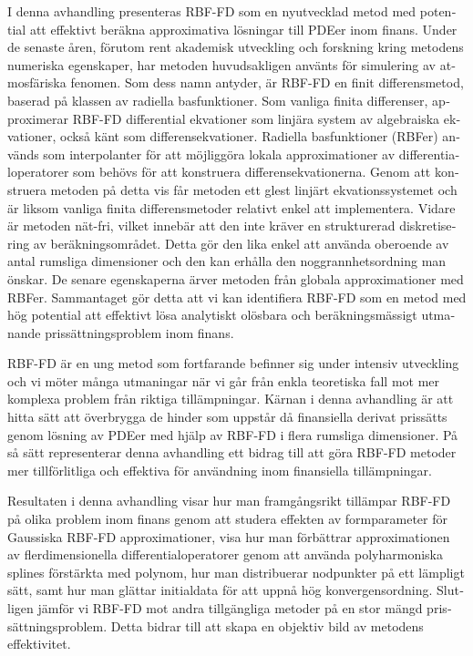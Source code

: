 \documentclass{UUThesisTemplate}
\begin{document}
\begin{swedish}
{\par
I denna avhandling presenteras RBF-FD som en nyutvecklad metod med potential att effektivt beräkna approximativa lösningar till PDEer inom finans.
Under de senaste åren, förutom rent akademisk utveckling och forskning kring metodens numeriska egenskaper, har metoden huvudsakligen använts för simulering av atmosfäriska fenomen.
Som dess namn antyder, är RBF-FD en finit differensmetod, baserad på klassen av radiella basfunktioner.
Som vanliga finita differenser, approximerar RBF-FD differential ekvationer som linjära system av algebraiska ekvationer, också känt som differensekvationer.
Radiella basfunktioner (RBFer) används som interpolanter för att möjliggöra lokala approximationer av differentialoperatorer som behövs för att konstruera differensekvationerna.
Genom att konstruera metoden på detta vis får metoden ett glest linjärt ekvationssystemet 
och är liksom vanliga finita differensmetoder relativt enkel att implementera.
Vidare är metoden nät-fri, vilket innebär att den inte kräver en strukturerad diskretisering av beräkningsområdet. Detta gör den lika enkel att använda oberoende av antal rumsliga dimensioner och den kan erhålla den noggrannhetsordning man önskar. De senare egenskaperna ärver metoden från globala approximationer med RBFer. Sammantaget gör detta att vi kan identifiera RBF-FD som en metod med hög potential att effektivt lösa analytiskt olösbara och beräkningsmässigt utmanande prissättningsproblem inom finans.

\par
RBF-FD är en ung metod som fortfarande befinner sig under intensiv utveckling
och vi möter många utmaningar när vi går från enkla teoretiska fall mot mer komplexa problem från riktiga tillämpningar.
Kärnan i denna avhandling är att hitta sätt att överbrygga de hinder som uppstår då finansiella derivat prissätts genom lösning av PDEer med hjälp av RBF-FD i flera rumsliga dimensioner.
På så sätt representerar denna avhandling ett bidrag till att göra RBF-FD metoder mer tillförlitliga och effektiva för användning inom finansiella tillämpningar.

\par
Resultaten i denna avhandling visar hur man framgångsrikt tillämpar RBF-FD på olika problem inom finans genom att studera effekten av formparameter för Gaussiska RBF-FD approximationer, visa hur man förbättrar approximationen av flerdimensionella differentialoperatorer genom att använda polyharmoniska splines förstärkta med polynom, hur man distribuerar nodpunkter på ett lämpligt sätt, samt hur man glättar initialdata för att uppnå hög konvergensordning. Slutligen jämför vi RBF-FD mot andra tillgängliga metoder på en stor mängd prissättningsproblem. Detta bidrar till att skapa en objektiv bild av metodens effektivitet.
}
\end{swedish}
\end{document}
